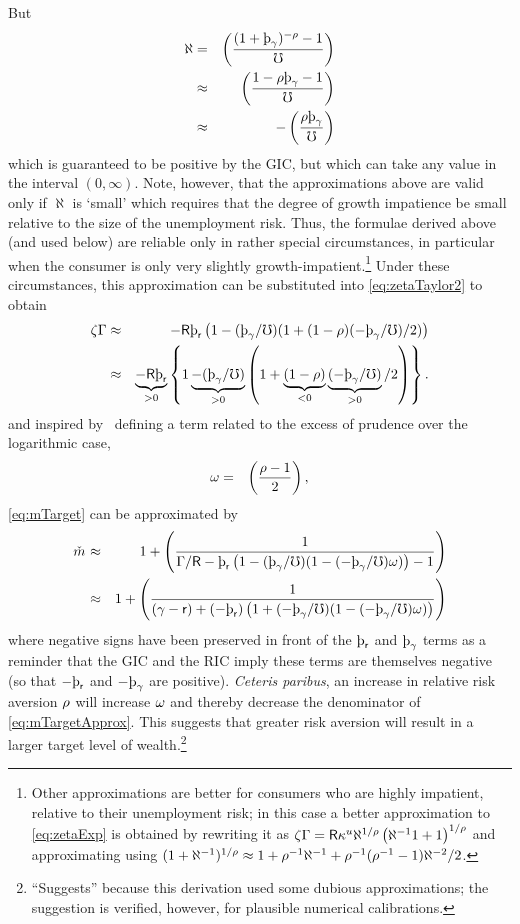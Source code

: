 \documentclass{handout}
\begin{document}
But
\begin{eqnarray}
  \label{eq:hatpi}
  \aleph & = & \left(\frac{(1+\patpGro)^{-\CRRA}-1}{\urate}\right)
\\ & \approx & \left(\frac{1- \CRRA \patpGro-1}{\urate}\right)
\\ & \approx & -\left(\frac{\CRRA \patpGro}{\urate}\right)
\end{eqnarray}
which is guaranteed to be positive by the GIC, but which can take any value in the interval $(0,\infty)$.  Note, however, that the approximations above are valid only if $\aleph$ is `small' which requires that the degree of growth impatience be small relative to the size of the unemployment risk.  Thus, the formulae derived above (and used below) are reliable only in rather special circumstances, in particular when the consumer is only very slightly growth-impatient.\footnote{Other approximations are better for consumers who are highly impatient, relative to their unemployment risk; in this case a better approximation to \eqref{eq:zetaExp} is obtained by rewriting it as $\zeta\Gamma = \mathsf{R} \kappa^{u} \aleph^{1/\rho} \left(\aleph^{-1}1+1\right)^{1/\rho}$ and approximating using $(1+\aleph^{-1})^{1/\rho} \approx 1 + \rho^{-1}\aleph^{-1}+\rho^{-1}(\rho^{-1}-1)\aleph^{-2}/2$.}  Under these circumstances, this approximation can be substituted into \eqref{eq:zetaTaylor2} to obtain
\begin{eqnarray}
  \zeta\PGro & \approx &  -\Rfree \patr \left(1-(\patpGro/\urate)(1+(1-\CRRA)(-\patpGro/\urate)/2)\right)
\\ & \approx & \underbrace{-\Rfree \patr}_{>0} \left\{1\underbrace{-(\patpGro/\urate)}_{>0}\left(1+\underbrace{(1-\CRRA)}_{<0}\underbrace{(-\patpGro/\urate)}_{>0}/2\right)\right\} \label{eq:zetaGammaApprox}
.
\end{eqnarray}
and inspired by~\cite{kimball:smallandlarge} defining a term related to the excess of prudence
over the logarithmic case,
\begin{eqnarray}
  \omega & = & \left(\frac{\rho-1}{2}\right),
\end{eqnarray}
\eqref{eq:mTarget} can be approximated by
\begin{eqnarray}
 \mTarg^{\null} & \approx & 1 + \left(\frac{1}{\PGro/\Rfree-\patr \left(1-(\patpGro/\urate)(1-(-\patpGro/\urate)\prudEx) \right)-1}\right)
\\ & \approx & 1 + \left(\frac{1}{(\pGro-\rfree)+(-\patr) \left(1+(-\patpGro/\urate)(1-(-\patpGro/\urate)\prudEx)\right)}\right)
\label{eq:mTargetApprox}
\end{eqnarray}
where negative signs have been preserved in front of the $\patr$ and $\patpGro$ terms as a reminder that
the GIC and the RIC imply these terms are themselves negative (so that $-\patr$ and $-\patpGro$ are positive).
{\it Ceteris paribus}, an increase in relative risk aversion $\rho$ will increase $\omega$ and thereby decrease the denominator of \eqref{eq:mTargetApprox}.  This suggests that
greater risk aversion will result in a larger target level of wealth.\footnote{``Suggests'' because
this derivation used some dubious approximations; the suggestion is verified, however, for
plausible numerical calibrations.}
\end{document}
